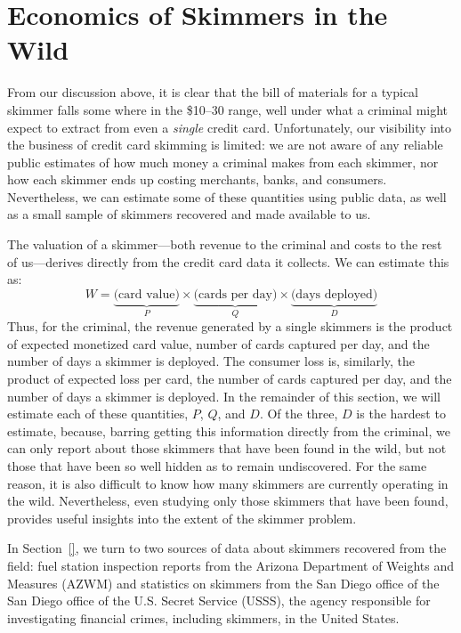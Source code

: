 \section{Economics of Skimmers in the Wild}
\label{sec:arizona}

From our discussion above, it is clear that the bill of materials for a typical skimmer falls some where in the
\$10--30 range, well under what a criminal might expect to extract from even a \emph{single} credit card.
Unfortunately, our visibility into the business of credit card skimming is limited: we are not aware of any reliable
public estimates of how much money a criminal makes from each skimmer, nor how each skimmer ends up costing merchants,
banks, and consumers. Nevertheless, we can estimate some of these quantities using public data, as well as a small
sample of skimmers recovered and made available to us.

The valuation of a skimmer---both revenue to the criminal and costs to the rest of us---derives directly from the
credit card data it collects. We can estimate this as:
%
\[W = \underbrace{\textrm{(card value)}}_{P}
\times \underbrace{\textrm{(cards per day)}}_{Q}
\times \underbrace{\textrm{(days deployed)}}_{D}\]
%
Thus, for the criminal, the revenue generated by a single skimmers is the product of expected monetized card value,
number of cards captured per day, and the number of days a skimmer is deployed. The consumer loss is, similarly, the
product of expected loss per card, the number of cards captured per day, and the number of days a skimmer is deployed.
In the remainder of this section, we will estimate each of these quantities, $P$, $Q$, and $D$. Of the three, $D$ is
the hardest to estimate, because, barring getting this information directly from the criminal, we can only report about
those skimmers that have been found in the wild, but not those that have been so well hidden as to remain undiscovered.
For the same reason, it is also difficult to know how many skimmers are currently operating in the wild. Nevertheless,
even studying only those skimmers that have been found, provides useful insights into the extent of the skimmer problem.

In Section~\ref{}, we turn to two sources of data about skimmers recovered from the field: fuel station inspection
reports from the Arizona Department of Weights and Measures (AZWM) and statistics on skimmers from the San Diego
office of the San Diego office of the U.S. Secret Service (USSS), the agency responsible for investigating financial
crimes, including skimmers, in the United States. 

